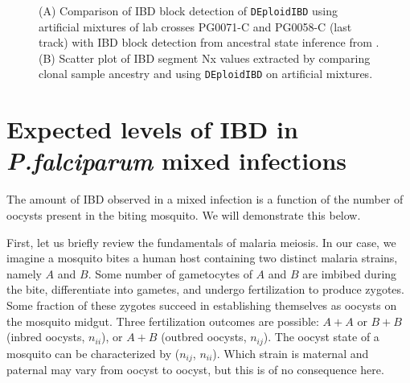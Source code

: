 \documentclass[9pt,lineno]{elife}
\begin{document}
\begin{figure}[ht]
  \centering{}
  \caption{(A) Comparison of IBD block detection of {\tt DEploidIBD} using artificial mixtures of lab crosses PG0071-C and PG0058-C (last track) with IBD block detection from ancestral state inference from \citet{Li2003}. (B) Scatter plot of IBD segment Nx values extracted by comparing clonal sample ancestry and using {\tt DEploidIBD} on artificial mixtures.}\label{fig:bgibd}
\end{figure}

\newpage
\FloatBarrier
\section{Expected levels of IBD in \textit{ P.falciparum } mixed infections}

The amount of IBD observed in a mixed infection is a function of the number of oocysts present in the biting mosquito. We will demonstrate this below.

First, let us briefly review the fundamentals of malaria meiosis. In our case, we imagine a mosquito bites a human host containing two distinct malaria strains, namely $A$ and $B$. Some number of gametocytes of $A$ and $B$ are imbibed during the bite, differentiate into gametes, and undergo fertilization to produce zygotes. Some fraction of these zygotes succeed in establishing themselves as oocysts on the mosquito midgut. Three fertilization outcomes are possible: $A+A$ or $B+B$ (inbred oocysts, $n_{ii}$), or $A+B$ (outbred oocysts, $n_{ij}$). The oocyst state of a mosquito can be characterized by ($n_{ij}$, $n_{ii}$). Which strain is maternal and paternal may vary from oocyst to oocyst, but this is of no consequence here.
\end{document}
